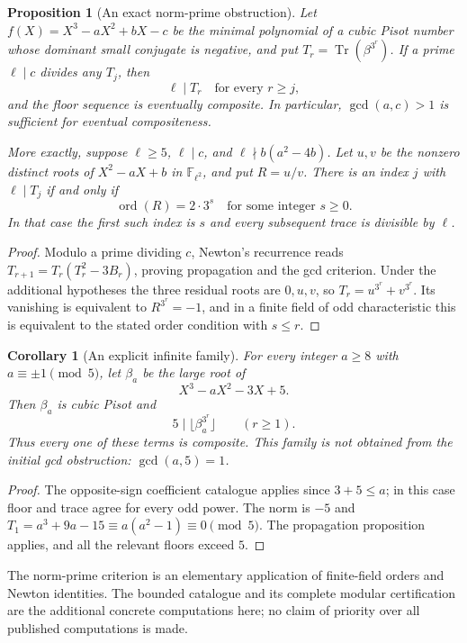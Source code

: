 \documentclass[11pt,a4paper]{article}
\newtheorem{proposition}[theorem]{Proposition}
\newtheorem{corollary}[theorem]{Corollary}
\theoremstyle{definition}
\theoremstyle{remark}
\numberwithin{equation}{section}
\begin{document}
\begin{proposition}[An exact norm-prime obstruction]
Let $f(X)=X^3-aX^2+bX-c$ be the minimal polynomial of a cubic
Pisot number whose dominant small conjugate is negative, and put
$T_r=\operatorname{Tr}(\beta^{3^r})$.
If a prime $\ell\mid c$ divides any $T_j$, then
\[
 \ell\mid T_r\quad\text{for every }r\ge j,
\]
and the floor sequence is eventually composite. In particular,
$\gcd(a,c)>1$ is sufficient for eventual compositeness.

More exactly, suppose $\ell\ge5$, $\ell\mid c$, and
$\ell\nmid b(a^2-4b)$. Let $u,v$ be the nonzero distinct roots of
$X^2-aX+b$ in $\mathbb F_{\ell^2}$, and put $R=u/v$.
There is an index $j$ with $\ell\mid T_j$ if and only if
\[
 \operatorname{ord}(R)=2\cdot3^s
 \quad\text{for some integer }s\ge0.
\]
In that case the first such index is $s$ and every subsequent
trace is divisible by $\ell$.
\end{proposition}
\begin{proof}
Modulo a prime dividing $c$, Newton's recurrence reads
$T_{r+1}=T_r(T_r^2-3B_r)$, proving propagation and the gcd criterion.
Under the additional hypotheses the three residual roots are
$0,u,v$, so $T_r=u^{3^r}+v^{3^r}$.
Its vanishing is equivalent to $R^{3^r}=-1$, and in a finite field
of odd characteristic this is equivalent to the stated order
condition with $s\le r$.
\end{proof}

\begin{corollary}[An explicit infinite family]
For every integer $a\ge8$ with $a\equiv\pm1\pmod5$, let $\beta_a$
be the large root of
\[
 X^3-aX^2-3X+5.
\]
Then $\beta_a$ is cubic Pisot and
\[
 5\mid\lfloor\beta_a^{3^r}\rfloor\qquad(r\ge1).
\]
Thus every one of these terms is composite. This family is not
obtained from the initial gcd obstruction: $\gcd(a,5)=1$.
\end{corollary}
\begin{proof}
The opposite-sign coefficient catalogue applies since $3+5\le a$;
in this case floor and trace agree for every odd power. The norm is
$-5$ and $T_1=a^3+9a-15\equiv a(a^2-1)\equiv0\pmod5$.
The propagation proposition applies, and all the relevant floors
exceed $5$.
\end{proof}

The norm-prime criterion is an elementary application of finite-field
orders and Newton identities. The bounded catalogue and its complete
modular certification are the additional concrete computations here;
no claim of priority over all published computations is made.
\clearpage
\end{document}

